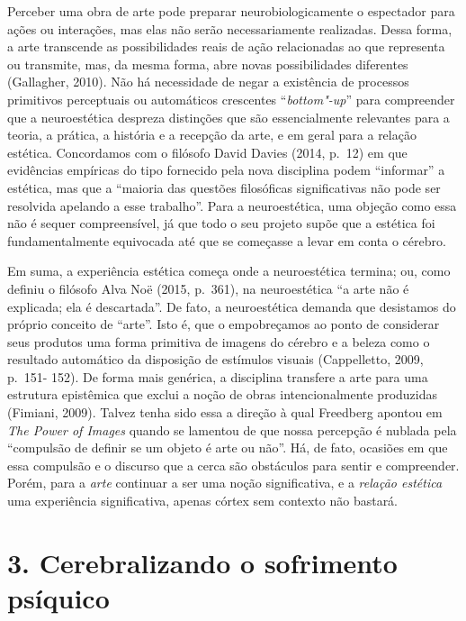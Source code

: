 Perceber uma obra de arte pode preparar neurobiologicamente o espectador
para ações ou interações, mas elas não serão necessariamente realizadas.
Dessa forma, a arte transcende as possibilidades reais de ação
relacionadas ao que representa ou transmite, mas, da mesma forma, abre
novas possibilidades diferentes (Gallagher, 2010). Não há necessidade de
negar a existência de processos primitivos perceptuais ou automáticos
crescentes ``\emph{bottom"-up}'' para compreender que a neuroestética
despreza distinções que são essencialmente relevantes para a teoria, a
prática, a história e a recepção da arte, e em geral para a relação
estética. Concordamos com o filósofo David Davies (2014, p.~12) em que
evidências empíricas do tipo fornecido pela nova disciplina podem
``informar'' a estética, mas que a ``maioria das questões filosóficas
significativas não pode ser resolvida apelando a esse trabalho''. Para a
neuroestética, uma objeção como essa não é sequer compreensível, já que
todo o seu projeto supõe que a estética foi fundamentalmente equivocada
até que se começasse a levar em conta o cérebro.

Em suma, a experiência estética começa onde a neuroestética termina; ou,
como definiu o filósofo Alva Noë (2015, p.~361), na neuroestética ``a
arte não é explicada; ela é descartada''. De fato, a neuroestética
demanda que desistamos do próprio conceito de ``arte''. Isto é, que o
empobreçamos ao ponto de considerar seus produtos uma forma primitiva de
imagens do cérebro e a beleza como o resultado automático da disposição
de estímulos visuais (Cappelletto, 2009, p.~151- 152). De forma mais
genérica, a disciplina transfere a arte para uma estrutura epistêmica
que exclui a noção de obras intencionalmente produzidas (Fimiani, 2009).
Talvez tenha sido essa a direção à qual Freedberg apontou em \emph{The
Power of Images} quando se lamentou de que nossa percepção é nublada
pela ``compulsão de definir se um objeto é arte ou não''. Há, de fato,
ocasiões em que essa compulsão e o discurso que a cerca são obstáculos
para sentir e compreender. Porém, para a \emph{arte} continuar a ser uma
noção significativa, e a \emph{relação estética} uma experiência
significativa, apenas córtex sem contexto não bastará.

\chapter{3. Cerebralizando o sofrimento psíquico}

